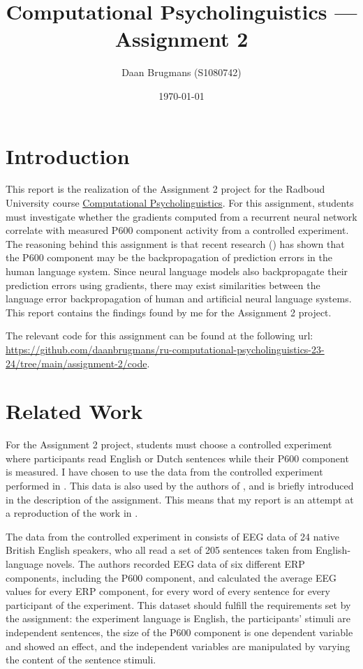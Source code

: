 \documentclass{IEEEtran}
\begin{document}
\title{Computational Psycholinguistics --- Assignment 2}
\author{Daan Brugmans (S1080742)}
\date{\today}

\maketitle

\section{Introduction}
This report is the realization of the Assignment 2 project for the Radboud University course \href{https://www.ru.nl/courseguides/arts/courses/ma/rema-lc/let-rema-lcex28/}{Computational Psycholinguistics}.
For this assignment, students must investigate whether the gradients computed from a recurrent neural network correlate with measured P600 component activity from a controlled experiment.
The reasoning behind this assignment is that recent research (\cite{fitz2019erp,frank2024gradients}) has shown that the P600 component may be the backpropagation of prediction errors in the human language system.
Since neural language models also backpropagate their prediction errors using gradients, there may exist similarities between the language error backpropagation of human and artificial neural language systems.
This report contains the findings found by me for the Assignment 2 project.

The relevant code for this assignment can be found at the following url: \url{https://github.com/daanbrugmans/ru-computational-psycholinguistics-23-24/tree/main/assignment-2/code}.

\section{Related Work}
For the Assignment 2 project, students must choose a controlled experiment where participants read English or Dutch sentences while their P600 component is measured.
I have chosen to use the data from the controlled experiment performed in \cite{frank2015erp}.
This data is also used by the authors of \cite{frank2024gradients}, and is briefly introduced in the description of the assignment.
This means that my report is an attempt at a reproduction of the work in \cite{frank2024gradients}.

The data from the controlled experiment in \cite{frank2015erp} consists of EEG data of 24 native British English speakers, who all read a set of 205 sentences taken from English-language novels.
The authors recorded EEG data of six different ERP components, including the P600 component, and calculated the average EEG values for every ERP component, for every word of every sentence for every participant of the experiment.
This dataset should fulfill the requirements set by the assignment: the experiment language is English, the participants' stimuli are independent sentences, the size of the P600 component is one dependent variable and showed an effect, and the independent variables are manipulated by varying the content of the sentence stimuli.
\end{document}
